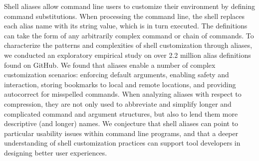 Shell aliases allow command line users to customize their environment by defining command substitutions.
When processing the command line, the shell replaces each alias name with its string value, which is in turn executed.
The definitions can take the form of any arbitrarily complex command or chain of commands.
To characterize the patterns and complexities of shell customization through aliases, we conducted an exploratory empirical study on over 2.2 million alias definitions found on GitHub.
We found that aliases enable a number of complex customization scenarios: enforcing default arguments, enabling safety and interaction, storing bookmarks to local and remote locations, and providing autocorrect for misspelled commands.
When analyzing aliases with respect to compression, they are not only used to abbreviate and simplify longer and complicated command and argument structures, but also to lend them more descriptive (and longer) names.
We conjecture that shell aliases can point to particular usability issues within command line programs, and that a deeper understanding of shell customization practices can support tool developers in designing better user experiences.